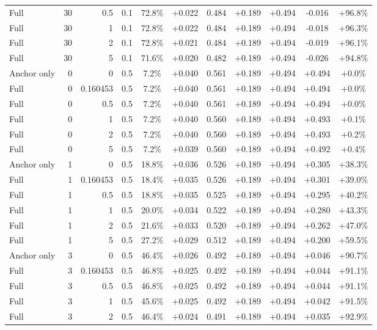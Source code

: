 \begin{table}[htbp]
\begin{tabular}{lrrrccccccc}
Full & 30 & 0.5 & 0.1 & 72.8\% & +0.022 & 0.484 & +0.189 & +0.494 & -0.016 & +96.8\% \\
Full & 30 & 1 & 0.1 & 72.8\% & +0.022 & 0.484 & +0.189 & +0.494 & -0.018 & +96.3\% \\
Full & 30 & 2 & 0.1 & 72.8\% & +0.021 & 0.484 & +0.189 & +0.494 & -0.019 & +96.1\% \\
Full & 30 & 5 & 0.1 & 71.6\% & +0.020 & 0.482 & +0.189 & +0.494 & -0.026 & +94.8\% \\
Anchor only & 0 & 0 & 0.5 & 7.2\% & +0.040 & 0.561 & +0.189 & +0.494 & +0.494 & +0.0\% \\
Full & 0 & 0.160453 & 0.5 & 7.2\% & +0.040 & 0.561 & +0.189 & +0.494 & +0.494 & +0.0\% \\
Full & 0 & 0.5 & 0.5 & 7.2\% & +0.040 & 0.561 & +0.189 & +0.494 & +0.494 & +0.0\% \\
Full & 0 & 1 & 0.5 & 7.2\% & +0.040 & 0.560 & +0.189 & +0.494 & +0.493 & +0.1\% \\
Full & 0 & 2 & 0.5 & 7.2\% & +0.040 & 0.560 & +0.189 & +0.494 & +0.493 & +0.2\% \\
Full & 0 & 5 & 0.5 & 7.2\% & +0.039 & 0.560 & +0.189 & +0.494 & +0.492 & +0.4\% \\
Anchor only & 1 & 0 & 0.5 & 18.8\% & +0.036 & 0.526 & +0.189 & +0.494 & +0.305 & +38.3\% \\
Full & 1 & 0.160453 & 0.5 & 18.4\% & +0.035 & 0.526 & +0.189 & +0.494 & +0.301 & +39.0\% \\
Full & 1 & 0.5 & 0.5 & 18.8\% & +0.035 & 0.525 & +0.189 & +0.494 & +0.295 & +40.2\% \\
Full & 1 & 1 & 0.5 & 20.0\% & +0.034 & 0.522 & +0.189 & +0.494 & +0.280 & +43.3\% \\
Full & 1 & 2 & 0.5 & 21.6\% & +0.033 & 0.520 & +0.189 & +0.494 & +0.262 & +47.0\% \\
Full & 1 & 5 & 0.5 & 27.2\% & +0.029 & 0.512 & +0.189 & +0.494 & +0.200 & +59.5\% \\
Anchor only & 3 & 0 & 0.5 & 46.4\% & +0.026 & 0.492 & +0.189 & +0.494 & +0.046 & +90.7\% \\
Full & 3 & 0.160453 & 0.5 & 46.8\% & +0.025 & 0.492 & +0.189 & +0.494 & +0.044 & +91.1\% \\
Full & 3 & 0.5 & 0.5 & 46.8\% & +0.025 & 0.492 & +0.189 & +0.494 & +0.044 & +91.1\% \\
Full & 3 & 1 & 0.5 & 45.6\% & +0.025 & 0.492 & +0.189 & +0.494 & +0.042 & +91.5\% \\
Full & 3 & 2 & 0.5 & 46.4\% & +0.024 & 0.491 & +0.189 & +0.494 & +0.035 & +92.9\% \\

\end{tabular}
\end{table}

